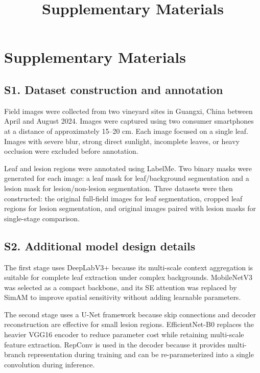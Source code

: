 \documentclass{article}
\title{Supplementary Materials}
\author{}
\date{}
\begin{document}
\maketitle

\section*{Supplementary Materials}

\subsection*{S1. Dataset construction and annotation}

Field images were collected from two vineyard sites in Guangxi, China
between April and August 2024. Images were captured using two consumer
smartphones at a distance of approximately 15--20 cm. Each image focused
on a single leaf. Images with severe blur, strong direct sunlight,
incomplete leaves, or heavy occlusion were excluded before annotation.

Leaf and lesion regions were annotated using LabelMe. Two binary masks
were generated for each image: a leaf mask for leaf/background
segmentation and a lesion mask for lesion/non-lesion segmentation. Three
datasets were then constructed: the original full-field images for leaf
segmentation, cropped leaf regions for lesion segmentation, and original
images paired with lesion masks for single-stage comparison.

\subsection*{S2. Additional model design details}

The first stage uses DeepLabV3+ because its multi-scale context
aggregation is suitable for complete leaf extraction under complex
backgrounds. MobileNetV3 was selected as a compact backbone, and its SE
attention was replaced by SimAM to improve spatial sensitivity without
adding learnable parameters.

The second stage uses a U-Net framework because skip connections and
decoder reconstruction are effective for small lesion regions.
EfficientNet-B0 replaces the heavier VGG16 encoder to reduce parameter
cost while retaining multi-scale feature extraction. RepConv is used in
the decoder because it provides multi-branch representation during
training and can be re-parameterized into a single convolution during
inference.
\end{document}

